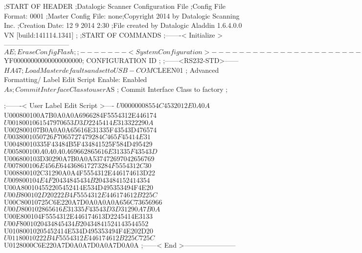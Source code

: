 ;START OF HEADER
;Datalogic Scanner Configuration File
;Config File Format: 0001
;Master Config File: none;Copyright 2014 by Datalogic Scanning Inc.
;Creation Date: 12 9 2014 2:30
;File created by Datalogic Aladdin 1.6.4.0.0 VN [build:141114.1341]
;
;START OF COMMANDS
;-------< Initialize >-----------------------------
$AE                 ; Erase Config Flash
;
;-------< System Configuration >-------------------------------
$YF00000000000000000000; CONFIGURATION ID
;
;------<RS232-STD>------
$HA47               ; Load Master defaults and set to USB-COM
$CLEEN01            ; Advanced Formatting/ Label Edit Script Enable: Enabled
$As                 ; Commit Interface Class to user
$AS                 ; Commit Interface Class to factory
;

;-------< User Label Edit Script >----
$U00000008554C4532012E0A0A
$U000800100A7B0A0A0A6966284F5554312E446174
$U0018001061547970653D3D2245414E313322290A
$U002800107B0A0A0A65616E31335F43543D476574
$U0038001050726F7065727479284C465F45414E31
$U00480010335F43484B5F434841525F584D495429
$U005800100A0A0A0A69662865616E31335F43543D
$U006800103D30290A7B0A0A537472697042656769
$U007800106E456E644368617273284F5554312C30
$U008800102C31290A0A4F5554312E446174613D22
$U009800104E4F20434845434B2043484152414354
$U00A800104552205452414E534D495353494F4E20
$U00B800102D20222B4F5554312E446174612B225C
$U00C80010725C6E220A7D0A0A0A0A656C73656966
$U00D800102865616E31335F43543D3D31290A7B0A
$U00E800104F5554312E446174613D2245414E3133
$U00F8001020434845434B20434841524143544552
$U01080010205452414E534D495353494F4E202D20
$U01180010222B4F5554312E446174612B225C725C
$U0128000C6E220A7D0A0A7D0A0A7D0A0A
;------< End >-----------------------
